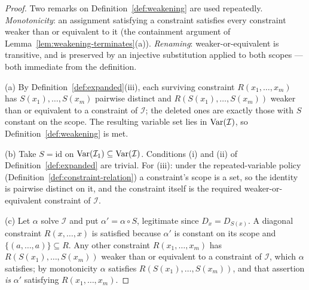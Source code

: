 \begin{proof}
Two remarks on Definition~\ref{def:weakening} are used repeatedly.
\emph{Monotonicity}: an assignment satisfying a constraint satisfies every
constraint weaker than or equivalent to it (the containment argument of
Lemma~\ref{lem:weakening-terminates}(a)). \emph{Renaming}: weaker-or-equivalent
is transitive, and is preserved by an injective substitution applied to both
scopes --- both immediate from the definition.

(a) By Definition~\ref{def:expanded}(iii), each surviving constraint
$R(x_{1},\dots,x_{m})$ has $S(x_{1}),\dots,S(x_{m})$ pairwise distinct and
$R(S(x_{1}),\dots,S(x_{m}))$ weaker than or equivalent to a constraint of
$\mathcal I$; the deleted ones are exactly those with $S$ constant on the
scope. The resulting variable set lies in $\operatorname{Var}(\mathcal I)$, so
Definition~\ref{def:weakening} is met.

(b) Take $S=\mathrm{id}$ on $\operatorname{Var}(\mathcal I_{1})\subseteq\operatorname{Var}(\mathcal I)$.
Conditions (i) and (ii) of Definition~\ref{def:expanded} are trivial. For
(iii): under the repeated-variable policy
(Definition~\ref{def:constraint-relation}) a constraint's scope is a set, so
the identity is pairwise distinct on it, and the constraint itself is the
required weaker-or-equivalent constraint of $\mathcal I$.

(c) Let $\alpha$ solve $\mathcal I$ and put $\alpha'=\alpha\circ S$, legitimate
since $D_{x}=D_{S(x)}$. A diagonal constraint $R(x,\dots,x)$ is satisfied
because $\alpha'$ is constant on its scope and
$\{(a,\dots,a)\}\subseteq R$. Any other constraint $R(x_{1},\dots,x_{m})$ has
$R(S(x_{1}),\dots,S(x_{m}))$ weaker than or equivalent to a constraint of
$\mathcal I$, which $\alpha$ satisfies; by monotonicity $\alpha$ satisfies
$R(S(x_{1}),\dots,S(x_{m}))$, and that assertion \emph{is}
$\alpha'$ satisfying $R(x_{1},\dots,x_{m})$.


\end{proof}
